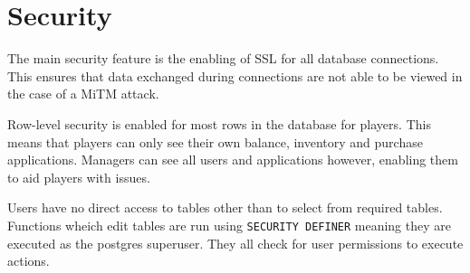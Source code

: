 \section{Security}

The main security feature is the enabling of SSL for all database connections. This ensures that data exchanged during connections are not able to be viewed in the case of a MiTM attack.

Row-level security is enabled for most rows in the database for players. This means that players can only see their own balance, inventory and purchase applications. Managers can see all users and applications however, enabling them to aid players with issues.

Users have no direct access to tables other than to select from required tables. Functions wheich edit tables are run using \verb|SECURITY DEFINER| meaning they are executed as the postgres superuser. They all check for user permissions to execute actions.
